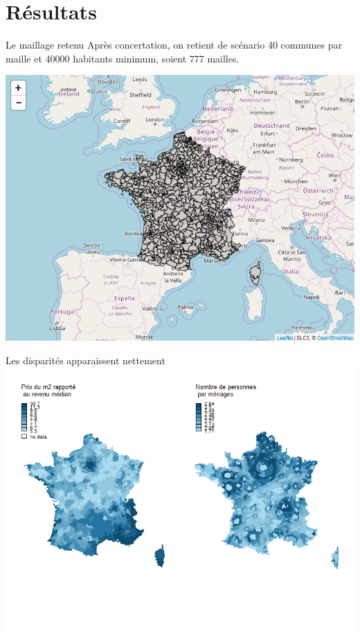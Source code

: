 \documentclass[11pt]{beamer}
\begin{document}
\section{Résultats}

\begin{frame}{Le maillage retenu}
Après concertation, on retient de scénario 40 communes par maille et 40000 habitants minimum, soient 777 mailles.
\begin{center}
\includegraphics[scale=.5]{img/Maille}
\end{center}
\end{frame}

\begin{frame}{Les disparités apparaissent nettement}
\includegraphics[scale=.6]{img/Discrim_mailles}
\end{frame}
\end{document}
